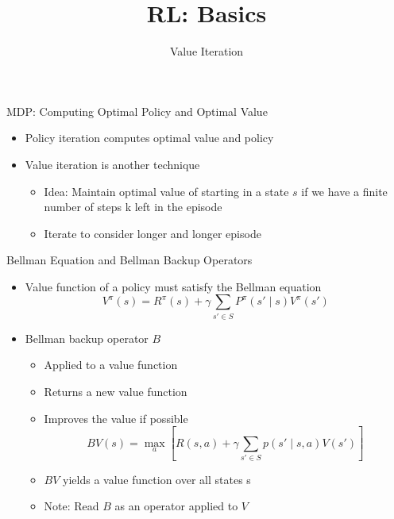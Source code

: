 \documentclass[aspectratio=169]{../latex_main/tntbeamer}  %
\title[Reinforcement Learning: Basics]{RL: Basics}
\subtitle{Value Iteration}
\begin{document}
	
	\maketitle

\begin{frame}[c]{MDP: Computing Optimal Policy and Optimal Value}

\begin{itemize}
	\item Policy iteration computes optimal value and policy
	\item Value iteration is another technique
	\begin{itemize}
		\item Idea: Maintain optimal value of starting in a state $s$ if we have a finite 	number of steps k left in the episode
		\item Iterate to consider longer and longer episode
	\end{itemize}

\end{itemize}

\end{frame}
\begin{frame}[c]{Bellman Equation and Bellman Backup Operators}

\begin{itemize}
	\item Value function of a policy must satisfy the Bellman equation
	$$V^\pi (s) = R^\pi (s) + \gamma \sum_{s' \in S}  P^\pi(s' \mid s ) V^\pi (s') $$
	\item Bellman backup operator $B$
	\begin{itemize}
		\item Applied to a value function
		 \item 	Returns a new value function
		 \item 	Improves the value if possible
		 $$ BV(s) = \max_{a} [ R(s,a) + \gamma \sum_{s' \in S} p(s' \mid s,a)  V(s')  ]$$
		 \item $BV$ yields a value function over all states s
		 \item Note: Read $B$ as an operator applied to $V$
	\end{itemize}
	
\end{itemize}

\end{frame}
\end{document}
